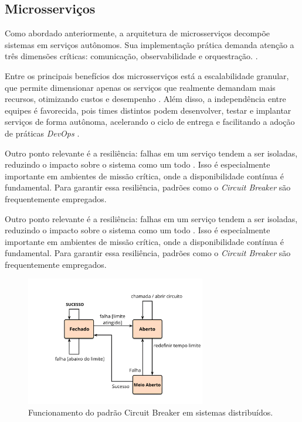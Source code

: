 \subsection{Microsserviços}
Como abordado anteriormente, a arquitetura de microsserviços decompõe sistemas em serviços autônomos. Sua implementação prática demanda atenção a três dimensões críticas: comunicação, observabilidade e orquestração. \cite{jamshidi2016systematic, nizami2020comparison}. 

Entre os principais benefícios dos microsserviços está a escalabilidade granular, que permite dimensionar apenas os serviços que realmente demandam mais recursos, otimizando custos e desempenho \cite{shekhar2023microservices}. Além disso, a independência entre equipes é favorecida, pois times distintos podem desenvolver, testar e implantar serviços de forma autônoma, acelerando o ciclo de entrega e facilitando a adoção de práticas \textit{DevOps} \cite{nizami2020comparison, farhan2023performance}.

Outro ponto relevante é a resiliência: falhas em um serviço tendem a ser isoladas, reduzindo o impacto sobre o sistema como um todo \cite{farhan2023performance}. Isso é especialmente importante em ambientes de missão crítica, onde a disponibilidade contínua é fundamental. Para garantir essa resiliência, padrões como o \textit{Circuit Breaker} são frequentemente empregados.

Outro ponto relevante é a resiliência: falhas em um serviço tendem a ser isoladas, reduzindo o impacto sobre o sistema como um todo \cite{farhan2023performance}. Isso é especialmente importante em ambientes de missão crítica, onde a disponibilidade contínua é fundamental. Para garantir essa resiliência, padrões como o \textit{Circuit Breaker} são frequentemente empregados.

\begin{figure}[H]
\centering
\includegraphics[width=0.7\textwidth]{./images/circuit_breaker.png}
\caption{Funcionamento do padrão Circuit Breaker em sistemas distribuídos.}
\label{fig:circuit-breaker}
\end{figure}

